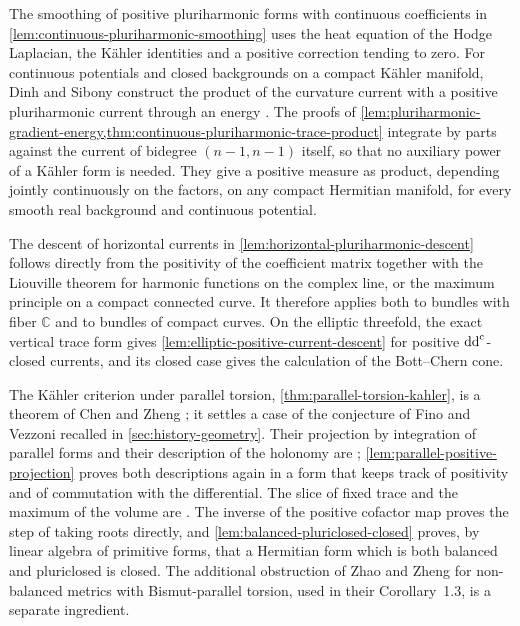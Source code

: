 The smoothing of positive pluriharmonic forms with continuous coefficients in \cref{lem:continuous-pluriharmonic-smoothing} uses the heat equation of the Hodge Laplacian, the K\"ahler identities and a positive correction tending to zero. For continuous potentials and closed backgrounds on a compact K\"ahler manifold, Dinh and Sibony construct the product of the curvature current with a positive pluriharmonic current through an energy \cite[Theorem~5.1, Proposition~5.2 and identity~(12), pp.~967--969]{DinhSibonyRegularization04}. The proofs of \cref{lem:pluriharmonic-gradient-energy,thm:continuous-pluriharmonic-trace-product} integrate by parts against the current of bidegree $(n-1,n-1)$ itself, so that no auxiliary power of a K\"ahler form is needed. They give a positive measure as product, depending jointly continuously on the factors, on any compact Hermitian manifold, for every smooth real background and continuous potential.

The descent of horizontal currents in \cref{lem:horizontal-pluriharmonic-descent} follows directly from the positivity of the coefficient matrix together with the Liouville theorem for harmonic functions on the complex line, or the maximum principle on a compact connected curve. It therefore applies both to bundles with fiber $\mathbb C$ and to bundles of compact curves. On the elliptic threefold, the exact vertical trace form gives \cref{lem:elliptic-positive-current-descent} for positive $\mathrm{dd}^{\mathrm{c}}$-closed currents, and its closed case gives the calculation of the Bott--Chern cone.

The K\"ahler criterion under parallel torsion, \cref{thm:parallel-torsion-kahler}, is a theorem of Chen and Zheng \cite[v1, Theorem~1.2, pp.~2 and~8]{CZParallel26}; it settles a case of the conjecture of Fino and Vezzoni recalled in \cref{sec:history-geometry}. Their projection by integration of parallel forms and their description of the holonomy are \cite[v1, Lemmas~3.1--3.2 and Propositions~3.3--3.5, pp.~3--6]{CZParallel26}; \cref{lem:parallel-positive-projection} proves both descriptions again in a form that keeps track of positivity and of commutation with the differential. The slice of fixed trace and the maximum of the volume are \cite[v1, Propositions~4.2 and~4.5, Lemmas~4.3--4.4, pp.~7--8]{CZParallel26}. The inverse of the positive cofactor map proves the step of taking roots directly, and \cref{lem:balanced-pluriclosed-closed} proves, by linear algebra of primitive forms, that a Hermitian form which is both balanced and pluriclosed is closed. The additional obstruction of Zhao and Zheng for non-balanced metrics with Bismut-parallel torsion, used in their Corollary~1.3, is a separate ingredient.

